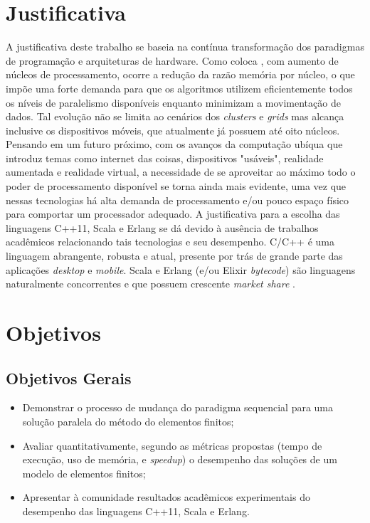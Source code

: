 \documentclass[
    12pt,               %
    openright,          %
    oneside,
    a4paper,            %
    english,            %
    french,             %
    spanish,            %
    brazil              %
    ]{abntex2}
\begin{document}
\chapter{Justificativa}

A justificativa deste trabalho se baseia na contínua transformação dos paradigmas de programação e arquiteturas de hardware. Como coloca , com aumento de núcleos de processamento, ocorre a redução da razão memória por núcleo, o que impõe uma forte demanda para que os algoritmos utilizem eficientemente todos os níveis de paralelismo disponíveis enquanto minimizam a movimentação de dados. Tal evolução não se limita ao cenários dos \textit{clusters} e \textit{grids} mas alcança inclusive os dispositivos móveis, que atualmente já possuem até oito núcleos. Pensando em um futuro próximo, com os avanços da computação ubíqua que introduz temas como internet das coisas, dispositivos "usáveis", realidade aumentada e realidade virtual, a necessidade de se aproveitar ao máximo todo o poder de processamento disponível se torna ainda mais evidente, uma vez que nessas tecnologias há alta demanda de processamento e/ou pouco espaço físico para comportar um processador adequado. A justificativa para a escolha das linguagens C++11, Scala e Erlang se dá devido à ausência de trabalhos acadêmicos relacionando tais tecnologias e seu desempenho. C/C++ é uma linguagem abrangente, robusta e atual, presente por trás de grande parte das aplicações \textit{desktop} e \textit{mobile}. Scala e Erlang (e/ou Elixir \textit{bytecode}) são linguagens naturalmente concorrentes e que possuem crescente \textit{market share} \nocite{erlang}\nocite{scala}.


\chapter{Objetivos}

\section{Objetivos Gerais}

	\begin{itemize}
		\item Demonstrar o processo de mudança do paradigma sequencial para uma solução paralela do método do elementos finitos;
		\item Avaliar quantitativamente, segundo as métricas propostas (tempo de execução, uso de memória, e \textit{speedup}) o desempenho das soluções de um modelo de elementos finitos;
		\item Apresentar à comunidade resultados acadêmicos experimentais do desempenho das  linguagens C++11, Scala e Erlang.
	\end{itemize}
		
\end{document}

